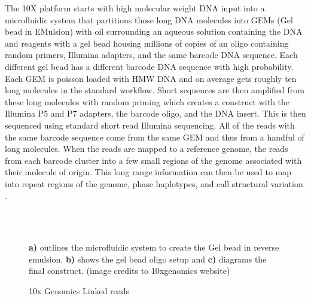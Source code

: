 \par{
The 10X platform starts with high molecular weight DNA input into a microfluidic system that partitions those long DNA molecules into GEMs (Gel bead in EMulsion) with oil surrounding an aqueous solution containing the DNA and reagents with a gel bead housing millions of copies of an oligo containing random primers, Illumina adapters, and the same barcode DNA sequence. Each different gel bead has a different barcode DNA sequence with high probability. Each GEM is poisson loaded with HMW DNA and on average gets roughly ten long molecules in the standard workflow. Short sequences are then amplified from these long molecules with random priming which creates a construct with the Illumina P5 and P7 adapters, the barcode oligo, and the DNA insert. This is then sequenced using standard short read Illumina sequencing. All of the reads with the same barcode sequence come from the same GEM and thus from a handful of long molecules. When the reads are mapped to a reference genome, the reads from each barcode cluster into a few small regions of the genome associated with their molecule of origin. This long range information can then be used to map into repeat regions of the genome, phase haplotypes, and call structural variation \cite{10xlinked}.
}

\begin{figure}[htbp!]

\caption{10x Genomics Linked reads}
\label{figure:linkedreads}
\begin{centering}
 \\
 \\
\par{\textbf{a)} outlines the microfluidic system to create the Gel bead in reverse emulsion. \textbf{b)} shows the gel bead oligo setup and \textbf{c)} diagrams the final construct. (image credits to 10xgenomics website)}
\end{centering}
\end{figure}

